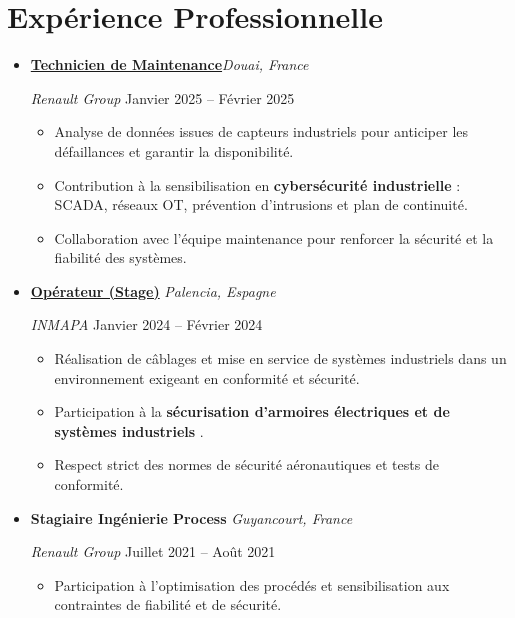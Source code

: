 \documentclass[a4paper,10pt]{article}
\begin{document}
\section*{Expérience Professionnelle}
\begin{itemize}[leftmargin=*]

  \item
  \textbf{\href{https://www.renaultgroup.com/}{Technicien de Maintenance}}\hfill \emph{Douai, France} \
  
  \emph{Renault Group} \hfill Janvier 2025 – Février 2025 \
  \begin{itemize}
     \item Analyse de données issues de capteurs industriels pour anticiper les défaillances et garantir la disponibilité.  
    \item Contribution à la sensibilisation en \textbf{cybersécurité industrielle} : SCADA, réseaux OT, prévention d’intrusions et plan de continuité.  
    \item Collaboration avec l’équipe maintenance pour renforcer la sécurité et la fiabilité des systèmes.    
  \end{itemize}

  \item
  \textbf{\href{https://www.inmapa.com/en/}{Opérateur (Stage)}} \hfill \emph{Palencia, Espagne} \
  
  \emph{INMAPA} \hfill Janvier 2024 – Février 2024 \
  \begin{itemize}
    \item Réalisation de câblages et mise en service de systèmes industriels dans un environnement exigeant en conformité et sécurité.  
    \item Participation à la \textbf{sécurisation d’armoires électriques et de systèmes industriels }.  
    \item Respect strict des normes de sécurité aéronautiques et tests de conformité.  
 
  \end{itemize}

  \item
  \textbf{Stagiaire Ingénierie Process} \hfill \emph{Guyancourt, France} \

  \emph{Renault Group} \hfill Juillet 2021 – Août 2021 \
  \begin{itemize}
     
    \item Participation à l’optimisation des procédés et sensibilisation aux contraintes de fiabilité et de sécurité.  
    
  \end{itemize}

\end{itemize}
\end{document}
